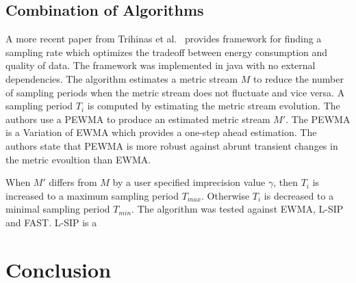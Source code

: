 \subsection{Combination of Algorithms}
\label{sec:Combination of Algorithms}
A more recent paper from Trihinas et al.~\cite{trihinas2015adam} provides
framework for finding a sampling rate which optimizes the tradeoff between
energy consumption and quality of data. The framework was implemented in java
with no external dependencies. The algorithm estimates a metric stream $ M $ to
reduce the number of sampling periods when the metric stream does not fluctuate
and vice versa. A sampling period $ T_i $ is computed by estimating the metric
stream evolution. The authors use a \ac{PEWMA} to produce an estimated metric
stream $ M' $. The \ac{PEWMA} is a Variation of \ac{EWMA} which provides a
one-step ahead estimation. The authors state that \ac{PEWMA} is more robust
against abrunt transient changes in the metric evoultion than \ac{EWMA}.

When $ M' $ differs from $ M $ by a user specified imprecision value $
\gamma $, then $ T_i $ is increased to a maximum sampling period $ T_{max}
$. Otherwise $ T_i $ is decreased to a minimal sampling period $ T_{min}
$. The algorithm was tested against \ac{EWMA}, L-SIP and FAST. L-SIP is a  



\section{Conclusion}

